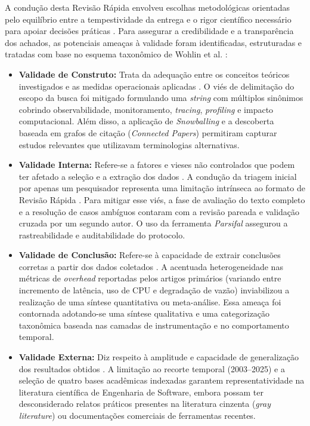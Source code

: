\documentclass[sigconf, anonymous]{acmart}
\begin{document}
A condução desta Revisão Rápida envolveu escolhas metodológicas orientadas pelo equilíbrio entre a tempestividade da entrega e o rigor científico necessário para apoiar decisões práticas \cite{cartaxo_2018}. Para assegurar a credibilidade e a transparência dos achados, as potenciais ameaças à validade foram identificadas, estruturadas e tratadas com base no esquema taxonômico de Wohlin et al. \cite{wohlin_2012}:

\begin{itemize}
    \item \textbf{Validade de Construto:} Trata da adequação entre os conceitos teóricos investigados e as medidas operacionais aplicadas \cite{wohlin_2012}. O viés de delimitação do escopo da busca foi mitigado formulando uma \textit{string} com múltiplos sinônimos cobrindo observabilidade, monitoramento, \textit{tracing}, \textit{profiling} e impacto computacional. Além disso, a aplicação de \textit{Snowballing} e a descoberta baseada em grafos de citação (\textit{Connected Papers}) permitiram capturar estudos relevantes que utilizavam terminologias alternativas.
    
    \item \textbf{Validade Interna:} Refere-se a fatores e vieses não controlados que podem ter afetado a seleção e a extração dos dados \cite{wohlin_2012}. A condução da triagem inicial por apenas um pesquisador representa uma limitação intrínseca ao formato de Revisão Rápida \cite{cartaxo_2018}. Para mitigar esse viés, a fase de avaliação do texto completo e a resolução de casos ambíguos contaram com a revisão pareada e validação cruzada por um segundo autor. O uso da ferramenta \textit{Parsifal} assegurou a rastreabilidade e auditabilidade do protocolo.
    
    \item \textbf{Validade de Conclusão:} Refere-se à capacidade de extrair conclusões corretas a partir dos dados coletados \cite{wohlin_2012}. A acentuada heterogeneidade nas métricas de \textit{overhead} reportadas pelos artigos primários (variando entre incremento de latência, uso de CPU e degradação de vazão) inviabilizou a realização de uma síntese quantitativa ou meta-análise. Essa ameaça foi contornada adotando-se uma síntese qualitativa e uma categorização taxonômica baseada nas camadas de instrumentação e no comportamento temporal.
    
    \item \textbf{Validade Externa:} Diz respeito à amplitude e capacidade de generalização dos resultados obtidos \cite{wohlin_2012}. A limitação ao recorte temporal (2003--2025) e a seleção de quatro bases acadêmicas indexadas garantem representatividade na literatura científica de Engenharia de Software, embora possam ter desconsiderado relatos práticos presentes na literatura cinzenta (\textit{gray literature}) ou documentações comerciais de ferramentas recentes.
\end{itemize}
\end{document}

